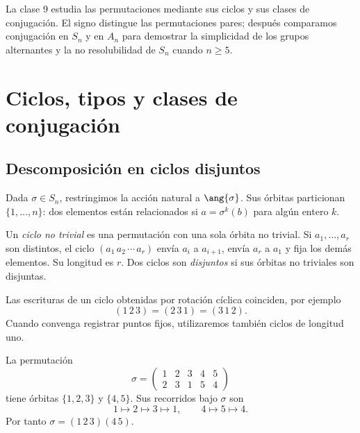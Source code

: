 La clase 9 estudia las permutaciones mediante sus ciclos y sus clases de conjugación. El signo distingue las permutaciones pares; después comparamos conjugación en $S_n$ y en $A_n$ para demostrar la simplicidad de los grupos alternantes y la no resolubilidad de $S_n$ cuando $n\ge5$.

\section{Ciclos, tipos y clases de conjugación}
\subsection{Descomposición en ciclos disjuntos}
Dada $\sigma\in S_n$, restringimos la acción natural a $\ang{\sigma}$. Sus órbitas particionan $\{1,\ldots,n\}$: dos elementos están relacionados si $a=\sigma^k(b)$ para algún entero $k$.
\begin{defi}
Un \emph{ciclo no trivial} es una permutación con una sola órbita no trivial. Si $a_1,\ldots,a_r$ son distintos, el ciclo $(a_1\,a_2\,\cdots\,a_r)$ envía $a_i$ a $a_{i+1}$, envía $a_r$ a $a_1$ y fija los demás elementos. Su longitud es $r$. Dos ciclos son \emph{disjuntos} si sus órbitas no triviales son disjuntas.
\end{defi}
Las escrituras de un ciclo obtenidas por rotación cíclica coinciden, por ejemplo
\[
(1\,2\,3)=(2\,3\,1)=(3\,1\,2).
\]
Cuando convenga registrar puntos fijos, utilizaremos también ciclos de longitud uno.
\begin{ejem}
La permutación
\[
\sigma=\begin{pmatrix}1&2&3&4&5\\2&3&1&5&4\end{pmatrix}
\]
tiene órbitas $\{1,2,3\}$ y $\{4,5\}$. Sus recorridos bajo $\sigma$ son
\[
1\mapsto2\mapsto3\mapsto1,
\qquad 4\mapsto5\mapsto4.
\]
Por tanto $\sigma=(1\,2\,3)(4\,5)$.
\end{ejem}

